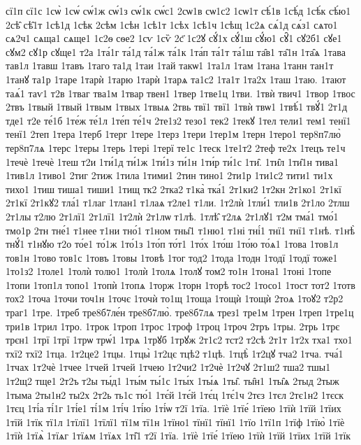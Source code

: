 {сї1п
сї1с
1сѡ̀
1сѡ́
сѡ́1ж
сѡ́1з
сѡ́1к
сѡ́с1
2сѡ1в
сѡ1с2
1сѡ1т
сѣ́1в
1сѣ́д
1сѣ́к
сѣ́ю1
2сѣ̑
сѣ̑1т
1сѣ1д
1сѣк
2сѣм
1сѣн
1сѣ1т
1сѣх
1сѣ1ч
1сѣщ
1с2ѧ
сѧ́1д
сѧ́з1
сѧто1
сѧ2ч1
сѧща1
сѧще1
1с2ѳ
сѳе2
1сѵ
1сѷ
2с҃
1с2ꙋ
сꙋ́1х
сꙋ́1ш
сꙋ́ю1
сꙋ̑1
сꙋ2б1
сꙋе1
сꙋм2
сꙋ1р
сꙋще1
т2а
1та́1г
та́1д
та́1ж
та́1к
1та́п
та́1т
та́1ш
та̑в1
та̑1н
1та̑ѧ
1тава
тав1л
1тавш
1тавъ
1таго
та1д
1таи
1тай
такѡ1
1та1л
1там
1тана
1танн
тан1т
1танꙋ
та1р
1таре
1тарѝ
1тарю
1тарѝ
1тарѧ
та1с2
1та1т
1та2х
1таш
1таю.
1тают
таѧ́1
таѵ1
т2в
1тваг
тва1м
1твар
твен1
1твер
1тве1ц
1тви.
1твѝ
твич1
1твор
1твос
2твъ
1твый
1твый
1твым
1твых
1твыѧ
2твь
твї1
твї1
1твѝ
твѡ1
1твѣ́1
твꙋ́1
2т1д
тде1
т2е
те́1б
1те́ж
те́1л
1те́п
те́1ч
2те1з2
тезо1
тек2
1текꙋ
1тел
тели1
тем1
тенї1
тенї1
2теп
1тера
1терб
1терг
1тере
1терз
1тери
1тер1м
1терн
1теро1
тер8п7лю̀
тер8п7лѧ
1терс
1теры
1терь
1тері
1терї
те1с
1теск
1те1т2
2теф
те2х
1тецъ
те1ч
1течѐ
1течѐ
1теш
т2и
1ти́1д
ти́1ж
1ти́1з
ти́1н
1ти́р
ти́1с
1ти̑.
1ти̑л
1ти̑1н
тива1
1тив1л
1тиво1
2тиг
2тиж
1тила
1тими1
2тин
тино1
2ти1р
1ти1с2
тити1
ти1х
тихо1
1тиш
тиша1
тиши1
1тищ
тк2
2тка2
т1ка̀
тка́1
2т1ки2
1т2кн
2т1ко1
2т1кї
2т1кї
2т1кꙋ2
тла́1
т1лаг
1тлан1
т1лаѧ
т2ле1
т1ли.
1т2лѝ
1тли́1
тли1в
2т1ло
2тлш
2т1лы
т2лю
2т1лї1
2т1лї1
1т2лѝ
2т1лѡ
т1лѣ.
1тлѣ̑
т2лѧ
2т1лꙋ1
т2м
тма́1
тмо́1
тмо1р
2тн
тне́1
т1нее
т1ни
тно́1
т1ном
тны̑1
т1ню1
т1ні
тні́1
тнї1
тнї1
т1нѣ.
т1нѣ̀
тнꙋ́1
т1нꙋю
т2о
то́е1
то́1ж
1то́1з
1то́п
то́т1
1то́х
1то́ш
1то́ю
то́ѧ1
1това
1тов1л
тов1н
1тово
тов1с
1товъ
1товы
1товѣ
1тог
тод2
1тода
1тодн
1тодї
1тодї
тоже1
1то1з2
1толе1
1толѝ
толю1
1толѝ
1толѧ
1толꙋ
том2
то1н
1тона1
1тоні
1топе
1топи
1топ1л
топо1
1топѝ
1топѧ
1торж
1торн
1торѣ
тос2
1тосо1
1тост
тот2
1тотв
тох2
1точа
1точи
точ1н
1точє
1точѝ
то1щ
1тоща
1тощѝ
1тощѝ
2тоѧ
1тоꙋ2
т2р2
траг1
1тре.
1треб
тре8б7ле́н
тре8б7лю̀.
тре8б7лѧ
трез1
тре1м
1трен
1треп
1тре1ц
три1в
1трил
1тро.
1трок
1троп
1трос
1троф
1троц
1троч
2тръ
1тры.
2трь
1трє
трєн1
1трї
1трї
1трѡ
трѡ́1
1трѧ
1трꙋб
1трꙋж
2т1с2
тст2
т2сѣ
2т1т
1т2х
тха1
тхо1
тхї2
тхї2
1тца.
1т2це2
1тцы.
1тцы̀
1т2цє
тцѣ2
т1цѣ.
1тцѣ̀
1т2цꙋ
тча2
1тча.
тча́1
1тчах
1т2чѐ
1тчее
1тчей
1тчей
1тчею
1т2чи2
1т2чѐ
1т2чꙋ
2т1ш2
тша2
тшы1
1т2щ2
тще1
2т2ъ
т2ы
ты́д1
1ты́м
ты́1с
1ты́х
1ты́ѧ
1ты̑.
ты̑н1
1ты̑ѧ
2тыд
2тыж
1тыма
2ты1н2
ты2х
2т2ь
ть1с
тю́1
1тє́й
1тє́й
1тє́ц
1тє́1ч
2тєз
1тєл
2тє1н2
1тєск
1тєц
1ті́а
ті́1г
1ті́е1
ті́1м
1ті́ч
1ті́ю
1ті́ѡ
т2ї
1тїа.
1тїѐ
1тїе́
1тїею
1тїѝ
1тїй
1тїих
1тїй
1тїк
тї1л
1тїлї1
1тїлї1
тї1м
тї1н
1тїно1
тїнї1
тїнї1
1тїо
1тї1п
1тїф
1тїю̀
1тїѐ
1тїѝ
1тїѧ̀
1тїѧг
1тїѧм
1тїѧх
1ті̑1
т2ї
1тїа.
1тїѐ
1тїе́
1тїею
1тїѝ
1тїй
1тїих
1тїй
1тїк
}
